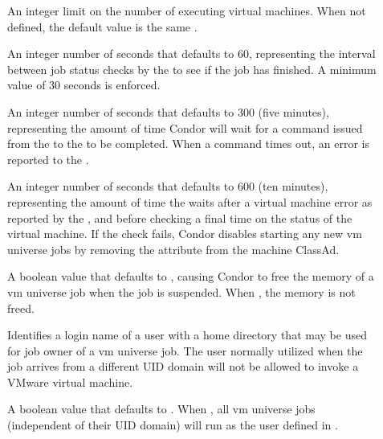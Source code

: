 \begin{description}
\item[]
  \label{param:VMMaxNumber}
  An integer limit on the number of executing virtual machines.
  When not defined, the default value is the same .

\item[]
  \label{param:VMStatusInterval}
  An integer number of seconds that defaults to 60,
  representing the interval between job status checks by the
   to see if the job has finished.
  A minimum value of 30 seconds is enforced.

\item[]
  \label{param:VMGAHPReqTimeout}
  An integer number of seconds that defaults to 300 (five minutes),
  representing the amount of time Condor will wait for a command issued
  from the  to the  to be completed.
  When a command times out, an error is reported to the .

\item[]
  \label{param:VMRecheckInterval}
  An integer number of seconds that defaults to 600 (ten minutes),
  representing the amount of time the  waits after a
  virtual machine error as reported by the ,
  and before checking a final time on the status of the virtual machine.
  If the check fails, Condor disables starting any new vm universe jobs
  by removing the  attribute from the machine ClassAd.

\item[]
  \label{param:VMSoftSuspend}
  A boolean value that defaults to ,
  causing Condor to free the memory of a vm universe job when
  the job is suspended.
  When , the memory is not freed.

\item[]
  \label{param:VMUnivNobodyUser}
  Identifies a login name of a user with a home directory that
  may be used for job owner of a vm universe job.
  The  user normally utilized when the job arrives
  from a different UID domain will not be allowed to invoke a VMware
  virtual machine.

\item[]
  \label{param:AlwaysVMUnivUseNobody}
  A boolean value that defaults to .
  When , all vm universe jobs (independent of their
  UID domain) will run as the user defined in .
\end{description}

